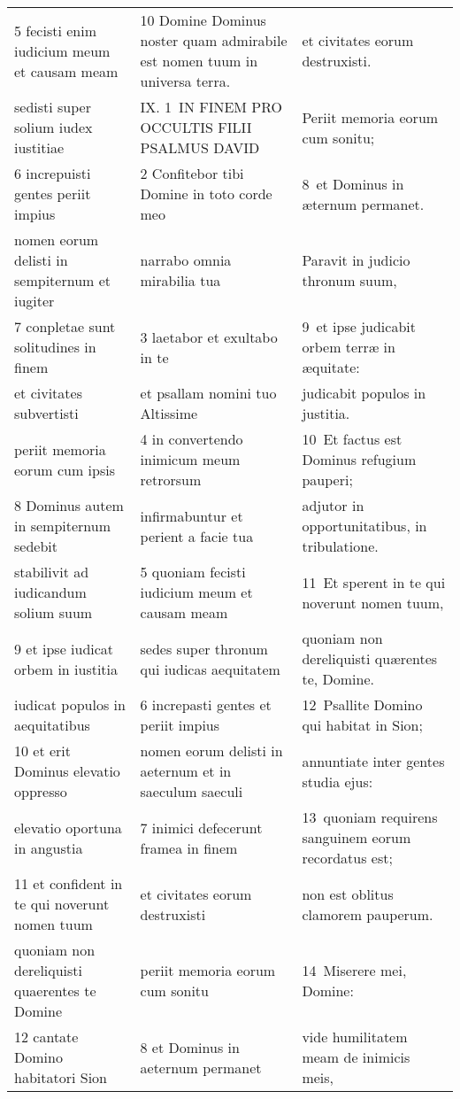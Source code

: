 \documentclass{article}
\begin{document}
\begin{longtable}{@{}p{}p{}p{}@{}}
5 fecisti enim iudicium meum et causam meam	&	10 Domine Dominus noster quam admirabile est nomen tuum in universa terra.	&	et civitates eorum destruxisti.	\\
sedisti super solium iudex iustitiae	&	IX. 1 IN FINEM PRO OCCULTIS FILII PSALMUS DAVID	&	Periit memoria eorum cum sonitu;	\\
6 increpuisti gentes periit impius	&	2 Confitebor tibi Domine in toto corde meo	&	8 et Dominus in æternum permanet.	\\
nomen eorum delisti in sempiternum et iugiter	&	narrabo omnia mirabilia tua	&	Paravit in judicio thronum suum,	\\
7 conpletae sunt solitudines in finem	&	3 laetabor et exultabo in te	&	9 et ipse judicabit orbem terræ in æquitate:	\\
et civitates subvertisti	&	et psallam nomini tuo Altissime	&	judicabit populos in justitia.	\\
periit memoria eorum cum ipsis	&	4 in convertendo inimicum meum retrorsum	&	10 Et factus est Dominus refugium pauperi;	\\
8 Dominus autem in sempiternum sedebit	&	infirmabuntur et perient a facie tua	&	adjutor in opportunitatibus, in tribulatione.	\\
stabilivit ad iudicandum solium suum	&	5 quoniam fecisti iudicium meum et causam meam	&	11 Et sperent in te qui noverunt nomen tuum,	\\
9 et ipse iudicat orbem in iustitia	&	sedes super thronum qui iudicas aequitatem	&	quoniam non dereliquisti quærentes te, Domine.	\\
iudicat populos in aequitatibus	&	6 increpasti gentes et periit impius	&	12 Psallite Domino qui habitat in Sion;	\\
10 et erit Dominus elevatio oppresso	&	nomen eorum delisti in aeternum et in saeculum saeculi	&	annuntiate inter gentes studia ejus:	\\
elevatio oportuna in angustia	&	7 inimici defecerunt framea in finem	&	13 quoniam requirens sanguinem eorum recordatus est;	\\
11 et confident in te qui noverunt nomen tuum	&	et civitates eorum destruxisti	&	non est oblitus clamorem pauperum.	\\
quoniam non dereliquisti quaerentes te Domine	&	periit memoria eorum cum sonitu	&	14 Miserere mei, Domine:	\\
12 cantate Domino habitatori Sion	&	8 et Dominus in aeternum permanet	&	vide humilitatem meam de inimicis meis,	\\

\end{longtable}
\end{document}
